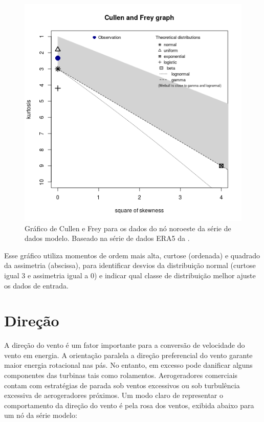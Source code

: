 \documentclass[
	12pt,				%
	openright,			%
	oneside,			%
	a4paper,			%
	english,			%
	french,				%
	spanish,			%
	brazil				%
	]{abntex2}
\begin{document}
\begin{figure}[h]
    \centering
	\includegraphics[scale=0.6]{cullen}
	\caption{Gráfico de Cullen e Frey para os dados do nó noroeste da série de dados modelo. Baseado na série de dados ERA5 da \cite{era5}.}
	\label{fig:cullen}
\end{figure}
\FloatBarrier

Esse gráfico utiliza momentos de ordem mais alta, curtose (ordenada) e quadrado da assimetria (abscissa), para identificar desvios da distribuição normal (curtose igual 3 e assimetria igual a 0) e indicar qual classe de distribuição melhor ajuste os dados de entrada.

\section{Direção}

A direção do vento é um fator importante para a conversão de velocidade do vento em energia. A orientação paralela a direção preferencial do vento garante maior energia rotacional nas pás. No entanto, em excesso pode danificar alguns componentes das turbinas tais como rolamentos. Aerogeradores comerciais contam com estratégias de parada sob ventos excessivos ou sob turbulência excessiva de aerogeradores próximos.
Um modo claro de representar o comportamento da direção do vento é pela rosa dos ventos, exibida abaixo para um nó da série modelo:
\end{document}
